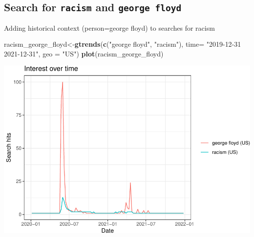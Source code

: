 \documentclass[
]{article}
\newenvironment{Shaded}{\begin{snugshade}}{\end{snugshade}}
\newcommand{\AttributeTok}[1]{\textcolor[rgb]{0.13,0.29,0.53}{#1}}
\newcommand{\FloatTok}[1]{\textcolor[rgb]{0.00,0.00,0.81}{#1}}
\newcommand{\FunctionTok}[1]{\textcolor[rgb]{0.13,0.29,0.53}{\textbf{#1}}}
\newcommand{\NormalTok}[1]{#1}
\newcommand{\OtherTok}[1]{\textcolor[rgb]{0.56,0.35,0.01}{#1}}
\newcommand{\SpecialCharTok}[1]{\textcolor[rgb]{0.81,0.36,0.00}{\textbf{#1}}}
\newcommand{\StringTok}[1]{\textcolor[rgb]{0.31,0.60,0.02}{#1}}
\begin{document}
\hypertarget{search-for-racism-and-george-floyd}{%
\subsection{\texorpdfstring{Search for \texttt{racism} and
\texttt{george\ floyd}}{Search for racism and george floyd}}\label{search-for-racism-and-george-floyd}}

Adding historical context (person=george floyd) to searches for racism

\begin{Shaded}
\begin{Highlighting}[]
\NormalTok{racism\_george\_floyd}\OtherTok{\textless{}{-}}\FunctionTok{gtrends}\NormalTok{(}\FunctionTok{c}\NormalTok{(}\StringTok{"george floyd"}\NormalTok{, }\StringTok{"racism"}\NormalTok{), }\AttributeTok{time=} \StringTok{"2019{-}12{-}31 2021{-}12{-}31"}\NormalTok{, }\AttributeTok{geo =} \StringTok{"US"}\NormalTok{)}
\FunctionTok{plot}\NormalTok{(racism\_george\_floyd)}
\end{Highlighting}
\end{Shaded}

\includegraphics{overview-keyword-racism_files/figure-latex/unnamed-chunk-7-1.pdf}

\begin{Shaded}
\end{Shaded}
\end{document}
